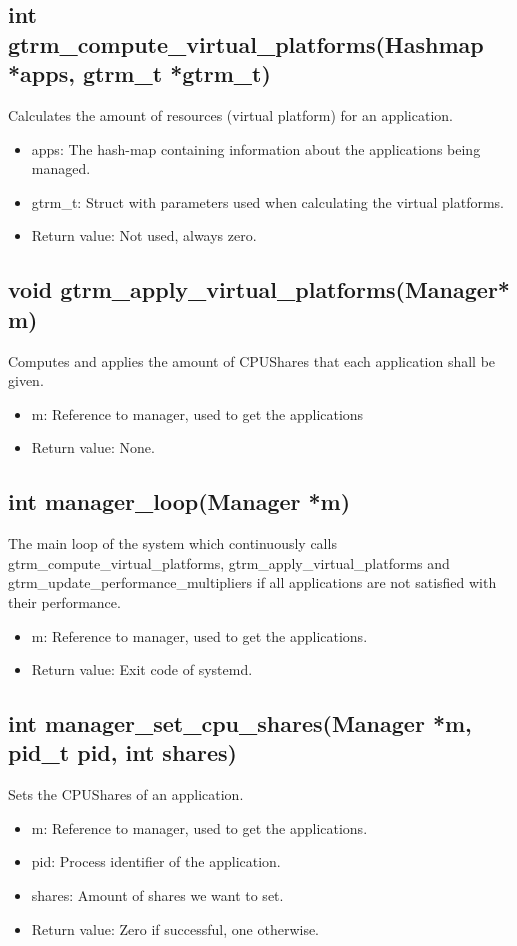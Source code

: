\documentclass[nobiblatex]{LTHthesis}
\begin{document}
\subsection{int gtrm\_compute\_virtual\_platforms(Hashmap *apps, gtrm\_t *gtrm\_t)}
Calculates the amount of resources (virtual platform) for an application.
\begin{itemize}
\item apps: The hash-map containing information about the applications being managed.
\item gtrm\_t: Struct with parameters used when calculating the virtual platforms.
\item Return value: Not used, always zero.
\end{itemize}

\subsection{void gtrm\_apply\_virtual\_platforms(Manager* m)}
Computes and applies the amount of CPUShares that each application shall be given.
\begin{itemize}
\item m: Reference to manager, used to get the applications
\item Return value: None.
\end{itemize}

\subsection{int manager\_loop(Manager *m)}
The main loop of the system which continuously calls gtrm\_compute\_virtual\_platforms, gtrm\_apply\_virtual\_platforms and gtrm\_update\_performance\_multipliers if all applications are not satisfied with their performance.
\begin{itemize}
\item m: Reference to manager, used to get the applications.
\item Return value: Exit code of systemd.
\end{itemize}

\subsection{int manager\_set\_cpu\_shares(Manager *m, pid\_t pid, int shares)}
Sets the CPUShares of an application.
\begin{itemize}
\item m: Reference to manager, used to get the applications.
\item pid: Process identifier of the application.
\item shares: Amount of shares we want to set.
\item Return value: Zero if successful, one otherwise.
\end{itemize}
\end{document}
